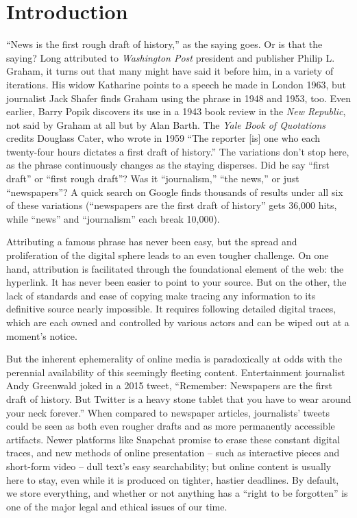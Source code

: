 \chapter{Introduction}

``News is the first rough draft of history,'' as the saying goes. Or is that the saying? Long attributed to \emph{Washington Post} president and publisher Philip L. Graham, it turns out that many might have said it before him, in a variety of iterations. His widow Katharine points to a speech he made in London 1963, but journalist Jack Shafer finds Graham using the phrase in 1948 and 1953, too.\autocite{shafer_who_2010} Even earlier, Barry Popik discovers its use in a 1943 book review in the \emph{New Republic}, not said by Graham at all but by Alan Barth. The \emph{Yale Book of Quotations} credits Douglass Cater, who wrote in 1959 ``The reporter [is] one who each twenty-four hours dictates a first draft of history.''\autocite[139]{shapiro_yale_2006} The variations don't stop here, as the phrase continuously changes as the staying disperses. Did he say ``first draft'' or ``first rough draft''? Was it ``journalism,'' ``the news,'' or just ``newspapers''? A quick search on Google finds thousands of results under all six of these variations (``newspapers are the first draft of history'' gets 36,000 hits, while ``news'' and ``journalism'' each break 10,000).

Attributing a famous phrase has never been easy, but the spread and proliferation of the digital sphere leads to an even tougher challenge. On one hand, attribution is facilitated through the foundational element of the web: the hyperlink. It has never been easier to point to your source. But on the other, the lack of standards and ease of copying make tracing any information to its definitive source nearly impossible. It requires following detailed digital traces, which are each owned and controlled by various actors and can be wiped out at a moment's notice.

But the inherent ephemerality of online media is paradoxically at odds with the perennial availability of this seemingly fleeting content. Entertainment journalist Andy Greenwald joked in a 2015 tweet, ``Remember: Newspapers are the first draft of history. But Twitter is a heavy stone tablet that you have to wear around your neck forever.''\autocite{greenwald_remember:_2015} When compared to newspaper articles, journalists' tweets could be seen as both even rougher drafts and as more permanently accessible artifacts. Newer platforms like Snapchat promise to erase these constant digital traces, and new methods of online presentation -- such as interactive pieces and short-form video -- dull text's easy searchability; but online content is usually here to stay, even while it is produced on tighter, hastier deadlines. By default, we store everything, and whether or not anything has a ``right to be forgotten'' is one of the major legal and ethical issues of our time.\autocite[See, e.g.,][]{arthur_explaining_2014, hakim_right_2014}

